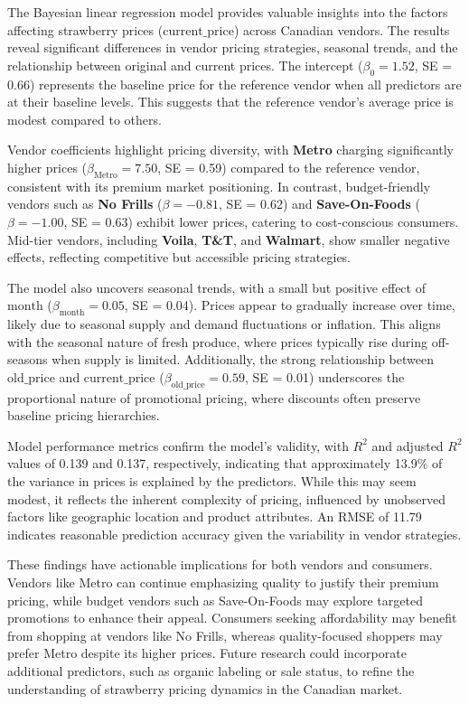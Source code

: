 \documentclass[
  letterpaper,
  DIV=11,
  numbers=noendperiod]{scrartcl}
\begin{document}
The Bayesian linear regression model provides valuable insights into the
factors affecting strawberry prices (\(\text{current\_price}\)) across
Canadian vendors. The results reveal significant differences in vendor
pricing strategies, seasonal trends, and the relationship between
original and current prices. The intercept (\(\beta_0 = 1.52\), SE =
0.66) represents the baseline price for the reference vendor when all
predictors are at their baseline levels. This suggests that the
reference vendor's average price is modest compared to others.

Vendor coefficients highlight pricing diversity, with \textbf{Metro}
charging significantly higher prices (\(\beta_{\text{Metro}} = 7.50\),
SE = 0.59) compared to the reference vendor, consistent with its premium
market positioning. In contrast, budget-friendly vendors such as
\textbf{No Frills} (\(\beta = -0.81\), SE = 0.62) and
\textbf{Save-On-Foods} (\(\beta = -1.00\), SE = 0.63) exhibit lower
prices, catering to cost-conscious consumers. Mid-tier vendors,
including \textbf{Voila}, \textbf{T\&T}, and \textbf{Walmart}, show
smaller negative effects, reflecting competitive but accessible pricing
strategies.

The model also uncovers seasonal trends, with a small but positive
effect of \(\text{month}\) (\(\beta_{\text{month}} = 0.05\), SE = 0.04).
Prices appear to gradually increase over time, likely due to seasonal
supply and demand fluctuations or inflation. This aligns with the
seasonal nature of fresh produce, where prices typically rise during
off-seasons when supply is limited. Additionally, the strong
relationship between \(\text{old\_price}\) and \(\text{current\_price}\)
(\(\beta_{\text{old\_price}} = 0.59\), SE = 0.01) underscores the
proportional nature of promotional pricing, where discounts often
preserve baseline pricing hierarchies.

Model performance metrics confirm the model's validity, with \(R^2\) and
adjusted \(R^2\) values of 0.139 and 0.137, respectively, indicating
that approximately 13.9\% of the variance in prices is explained by the
predictors. While this may seem modest, it reflects the inherent
complexity of pricing, influenced by unobserved factors like geographic
location and product attributes. An RMSE of 11.79 indicates reasonable
prediction accuracy given the variability in vendor strategies.

These findings have actionable implications for both vendors and
consumers. Vendors like Metro can continue emphasizing quality to
justify their premium pricing, while budget vendors such as
Save-On-Foods may explore targeted promotions to enhance their appeal.
Consumers seeking affordability may benefit from shopping at vendors
like No Frills, whereas quality-focused shoppers may prefer Metro
despite its higher prices. Future research could incorporate additional
predictors, such as organic labeling or sale status, to refine the
understanding of strawberry pricing dynamics in the Canadian market.
\end{document}

